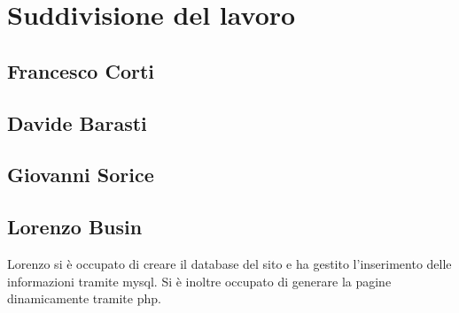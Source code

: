 \newpage

\section{Suddivisione del lavoro}

\subsection{Francesco Corti}

\subsection{Davide Barasti}

\subsection{Giovanni Sorice}

\subsection{Lorenzo Busin}
Lorenzo si è occupato di creare il database del sito e ha gestito l'inserimento delle informazioni tramite mysql. Si è inoltre occupato di generare la pagine dinamicamente tramite php. 
